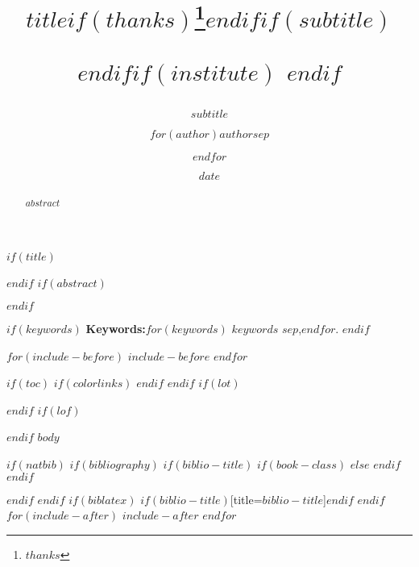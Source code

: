 \documentclass[$if(fontsize)$$fontsize$,$endif$$if(lang)$$babel-lang$,$endif$$if(papersize)$$papersize$paper,$endif$$for(classoption)$$classoption$$sep$,$endfor$]{$documentclass$}
\title{$title$$if(thanks)$\thanks{$thanks$}$endif$$if(subtitle)$%
		\subtitle{$subtitle$}$endif$$if(institute)$\institute{$institute$}%
		$endif$}
\author{$for(author)$$author$$sep$ \and $endfor$}
\institute{$for(institute)$$institute$$sep$ \and $endfor$}
\date{$date$}
\begin{document}
	$if(title)$
		\maketitle
	$endif$
	$if(abstract)$
		\begin{abstract}
			$abstract$
		\end{abstract}
	$endif$

	$if(keywords)$
		\vfill
    \textbf{Keywords:}$for(keywords)$ $keywords$ $sep$,$endfor$.
	$endif$

	$for(include-before)$
		$include-before$
	$endfor$

	$if(toc)${
		$if(colorlinks)$
			\hypersetup{linkcolor=$if(toccolor)$$toccolor$$else$black$endif$}
		$endif$
		\setcounter{tocdepth}{$toc-depth$}
		\tableofcontents
	}
	$endif$
	$if(lot)$
		\listoftables
	$endif$
	$if(lof)$
		\listoffigures
	$endif$
	$body$

	$if(natbib)$
	$if(bibliography)$
	$if(biblio-title)$
	$if(book-class)$
		\renewcommand\bibname{$biblio-title$}
	$else$
		\renewcommand\refname{$biblio-title$}
	$endif$
	$endif$
	

	$endif$
	$endif$
	$if(biblatex)$
		\printbibliography$if(biblio-title)$[title=$biblio-title$]$endif$
	$endif$
	$for(include-after)$
		$include-after$
	$endfor$
\end{document}
